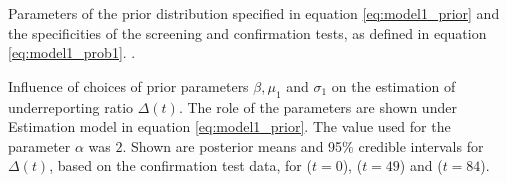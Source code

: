 
\begin{table}[!htb]
\begin{center}
\caption{Parameters of the prior distribution specified in equation \ref{eq:model1_prior} and the specificities of the screening and confirmation tests, as defined in equation \ref{eq:model1_prob1}. 
\label{tab:priors}.}


\end{center}
\end{table}

\newpage

\begin{table}[!htb]
\begin{center}
\caption{Influence of choices of prior parameters $\beta, \mu_1$ and $\sigma_1$ on the estimation of underreporting ratio $\Delta(t)$. The role of the parameters are shown under Estimation model in equation \ref{eq:model1_prior}. The value used for the parameter $\alpha$ was $2$. Shown are posterior means and 95\% credible intervals for $\Delta(t)$, based on the confirmation test data, for  ($t= 0$),  ($t=49$) and  ($t = 84$).} 



\label{tab:sensitivity_ratio}
\end{center}
\end{table}
